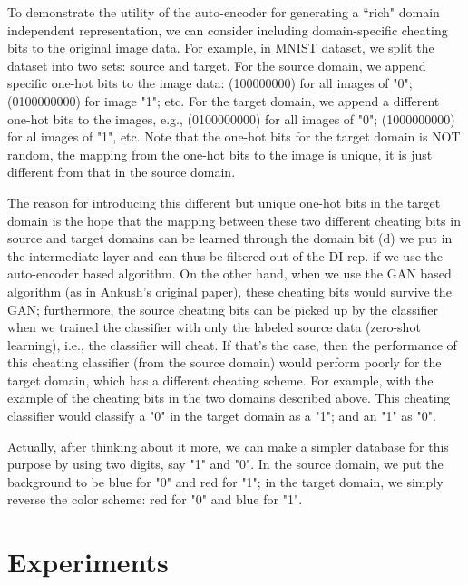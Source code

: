 \documentclass{article}
\newcommand{\elisa}[1]{\textbf{\color{red}Elisa: #1}}
\begin{document}
{To demonstrate the utility of the auto-encoder for generating a ``rich" domain independent representation, we can consider including domain-specific cheating
bits to the original image data. For example, in MNIST dataset, we split the dataset into two sets: source and target. For the source domain, we append 
specific one-hot bits to the image data: (100000000) for all images of "0"; (0100000000) for image "1"; etc. For the target domain, we append a different one-hot bits to the images, e.g., (0100000000) for all images of "0"; (1000000000) for al images of "1", etc. Note that the one-hot bits for the target domain is NOT random, the mapping from the one-hot bits to the image is unique, it is just different from that in the source domain.

The reason for introducing this different but unique one-hot bits in the target domain is the hope that the mapping between these two different cheating bits in source and target domains can be learned through the domain bit (d) we put in the intermediate layer and can thus be filtered out of the DI rep. if we use the auto-encoder based algorithm. On the other hand, when we use the GAN based algorithm (as in Ankush's original paper), these cheating bits would survive the GAN; furthermore, the source cheating bits can be picked up by the classifier when we trained the classifier with only the labeled source data (zero-shot learning), i.e., the classifier will cheat. If that's the case, then the performance of this cheating classifier (from the source domain) would perform poorly for the target domain, which has a different cheating scheme. For example, with the example of the cheating bits in the two domains described above. This cheating classifier would classify a "0" in the target domain as a "1"; and an "1" as "0".

Actually, after thinking about it more, we can make a simpler database for this purpose by using two digits, say "1" and "0". In the source domain, we put the background to be blue for "0" and red for "1"; in the target domain, we simply reverse the color scheme: red for "0" and blue for "1". 
}




 \section{Experiments}
 \label{Experiments}
\end{document}
